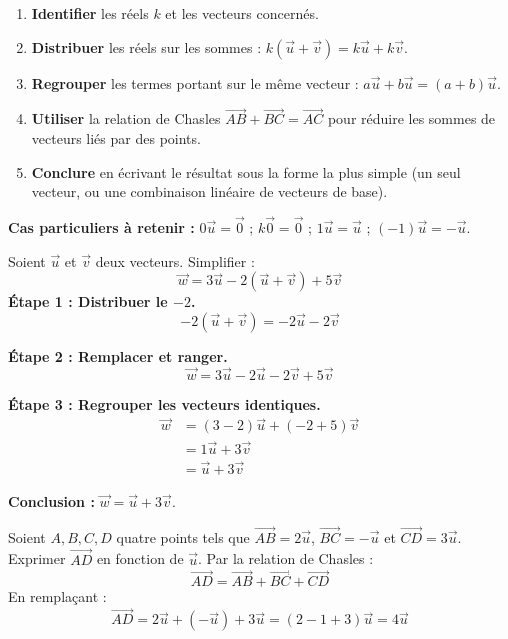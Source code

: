 \documentclass[11pt]{article}
\begin{document}
\begin{methode}
\begin{enumerate}
\item \textbf{Identifier} les réels $k$ et les vecteurs concernés.
\item \textbf{Distribuer} les réels sur les sommes : $k(\vec{u}+\vec{v}) = k\vec{u} + k\vec{v}$.
\item \textbf{Regrouper} les termes portant sur le même vecteur : $a\vec{u} + b\vec{u} = (a+b)\vec{u}$.
\item \textbf{Utiliser} la relation de Chasles $\overrightarrow{AB}+\overrightarrow{BC}=\overrightarrow{AC}$ pour réduire les sommes de vecteurs liés par des points.
\item \textbf{Conclure} en écrivant le résultat sous la forme la plus simple (un seul vecteur, ou une combinaison linéaire de vecteurs de base).
\end{enumerate}
\textbf{Cas particuliers à retenir :} $0\vec{u}=\vec{0}$ ; $k\vec{0}=\vec{0}$ ; $1\vec{u}=\vec{u}$ ; $(-1)\vec{u}=-\vec{u}$.
\end{methode}

\begin{exoresolu}
Soient $\vec{u}$ et $\vec{v}$ deux vecteurs. Simplifier :
\[ \vec{w} = 3\vec{u} - 2(\vec{u} + \vec{v}) + 5\vec{v} \]
\tcblower
\textbf{Étape 1 : Distribuer le $-2$.}
\[ -2(\vec{u}+\vec{v}) = -2\vec{u} - 2\vec{v} \]

\textbf{Étape 2 : Remplacer et ranger.}
\[ \vec{w} = 3\vec{u} - 2\vec{u} - 2\vec{v} + 5\vec{v} \]

\textbf{Étape 3 : Regrouper les vecteurs identiques.}
\begin{align*}
\vec{w} &= (3-2)\vec{u} + (-2+5)\vec{v} \\
&= 1\vec{u} + 3\vec{v} \\
&= \vec{u} + 3\vec{v}
\end{align*}

\textbf{Conclusion :} $\vec{w} = \vec{u} + 3\vec{v}$.
\end{exoresolu}

\begin{exoresolu}
Soient $A, B, C, D$ quatre points tels que $\overrightarrow{AB} = 2\vec{u}$, $\overrightarrow{BC} = -\vec{u}$ et $\overrightarrow{CD} = 3\vec{u}$.
Exprimer $\overrightarrow{AD}$ en fonction de $\vec{u}$.
\tcblower
Par la relation de Chasles :
\[ \overrightarrow{AD} = \overrightarrow{AB} + \overrightarrow{BC} + \overrightarrow{CD} \]
En remplaçant :
\[ \overrightarrow{AD} = 2\vec{u} + (-\vec{u}) + 3\vec{u} = (2 - 1 + 3)\vec{u} = 4\vec{u} \]
\end{exoresolu}
\end{document}
